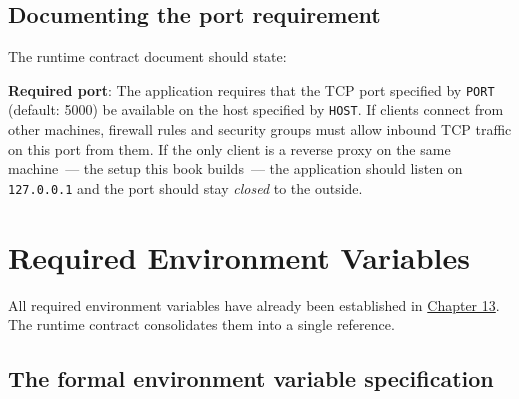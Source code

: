 \subsection*{Documenting the port requirement}\label{14-runtime-contract:documenting-the-port-requirement}

The runtime contract document should state:

\begin{notebox}

\textbf{Required port}: The application requires that the TCP port specified by \texttt{PORT} (default: 5000) be available on the host specified by \texttt{HOST}. If clients connect from other machines, firewall rules and security groups must allow inbound TCP traffic on this port from them. If the only client is a reverse proxy on the same machine~--- the setup this book builds~--- the application should listen on \texttt{127.0.0.1} and the port should stay \emph{closed} to the outside.

\end{notebox}

\setcounter{section}{3}
\section{Required Environment Variables}\label{14-runtime-contract:144-required-environment-variables}

All required environment variables have already been established in \hyperref[ch:13-configuration-externalization]{Chapter 13}. The runtime contract consolidates them into a single reference.

\subsection*{The formal environment variable specification}\label{14-runtime-contract:the-formal-environment-variable-specification}

